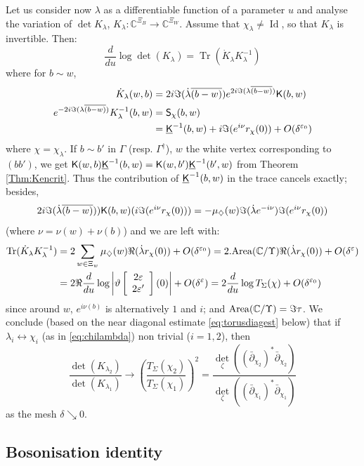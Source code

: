 \documentclass[10pt]{article}
\newcommand{\C}{\mathbb{C}}
\newcommand{\eps}{\varepsilon}
\newcommand{\rK}{{\sf K}}
\newcommand{\uK}{{\underline {\sf K}}}
\newcommand{\rS}{{\sf S}}
\newcommand{\dg}{\dagger}
\newcommand{\dmd}{\diamondsuit}
\newcommand{\dbar}{\bar\partial}
\DeclareMathOperator{\Tr}{Tr}
\DeclareMathOperator{\Id}{Id}
\newcommand{\thetaf}[2]{\vartheta\left [\begin{array}{c}#1\\#2\end{array}\right]}
\begin{document}
Let us consider now $\lambda$ as a differentiable function of a parameter $u$ and analyse the variation of $\det K_\lambda$, $K_\lambda:\C^{\Xi_B}\rightarrow\C^{\Xi_W}$. Assume that $\chi_\lambda\neq\Id$, so that $K_\lambda$ is invertible. Then:
$$\frac{d}{du}\log\det(K_\lambda)=\Tr(\dot K_\lambda K_\lambda^{-1})$$
where for $b\sim w$,
\begin{align*}
\dot K_\lambda(w,b)&=2i\Im(\dot\lambda\overline{(b-w)})e^{2i\Im(\lambda\overline{(b-w)})}\rK(b,w)\\
e^{-2i\Im(\lambda\overline{(b-w)})}K_\lambda^{-1}(b,w)&=\rS_{\chi}(b,w)\\
&=\uK^{-1}(b,w)+i\Im(e^{i\nu}r_\chi(0))+O(\delta^{\eps_0})
\end{align*}
where $\chi=\chi_\lambda$. If $b\sim b'$ in $\Gamma$ (resp. $\Gamma^\dg$), $w$ the white vertex corresponding to $(bb')$, we get $\rK(w,b)\uK^{-1}(b,w)=\rK(w,b')\uK^{-1}(b',w)$ from Theorem \ref{Thm:Kencrit}. Thus the contribution of $\uK^{-1}(b,w)$ in the trace cancels exactly; besides,
$$2i\Im(\dot\lambda\overline{(b-w)}))\rK(b,w)(i\Im(e^{i\nu}r_\chi(0)))=
-\mu_\dmd(w)\Im(\dot\lambda e^{-i\nu})\Im(e^{i\nu}r_\chi(0))$$
(where $\nu=\nu(w)+\nu(b)$) and we are left with:
\begin{align*}
\Tr(\dot K_\lambda K_\lambda^{-1})&=2\sum_{w\in\Xi_w}\mu_\dmd(w)\Re(\dot\lambda r_\chi(0))+O(\delta^{\eps_0})=2.{\rm Area}(\C/\Upsilon)\Re(\dot\lambda r_\chi(0))+O(\delta^\eps)\\
&=2\Re\frac{d}{du}\log\left|\thetaf{2\eps}{2\eps'}(0)\right|+O(\delta^\eps)=2\frac{d}{du}\log T_\Sigma(\chi)+O(\delta^{\eps_0})
\end{align*}
since around $w$, $e^{i\nu(b)}$ is alternatively $1$ and $i$; and ${\rm Area}(\C/\Upsilon)=\Im\tau$. We conclude (based on the near diagonal estimate \eqref{eq:torusdiagest} below) that if $\lambda_i\leftrightarrow\chi_i$ (as in \eqref{eq:chilambda}) non trivial ($i=1,2$), then
\begin{equation}\label{eq:discrtors}
\frac{\det(K_{\lambda_2})}{\det(K_{\lambda_1})}\longrightarrow\left(\frac{T_\Sigma(\chi_2)}{T_\Sigma(\chi_1)}\right)^2=\frac{\det_\zeta((\dbar_{\chi_2})^*\dbar_{\chi_2})}{\det_\zeta((\dbar_{\chi_1})^*\dbar_{\chi_1})}
\end{equation}
as the mesh $\delta\searrow 0$.






\subsection{Bosonisation identity}\label{subsec:bosonid}
\end{document}
